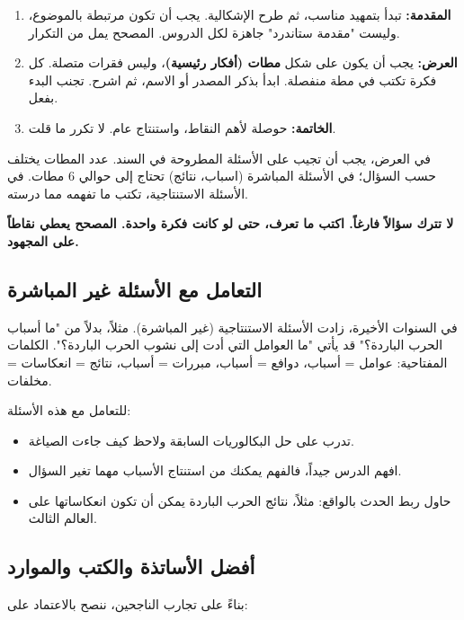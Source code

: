 \documentclass[12pt,a4paper]{book}
\newcommand{\importantAr}[1]{%
	\begin{important}
		\bfseries #1
	\end{important}
}
\begin{document}
	\begin{enumerate}
		\item \textbf{المقدمة:} تبدأ بتمهيد مناسب، ثم طرح الإشكالية. يجب أن تكون مرتبطة بالموضوع، وليست "مقدمة ستاندرد" جاهزة لكل الدروس. المصحح يمل من التكرار.
		\item \textbf{العرض:} يجب أن يكون على شكل \textbf{مطات (أفكار رئيسية)}، وليس فقرات متصلة. كل فكرة تكتب في مطة منفصلة. ابدأ بذكر المصدر أو الاسم، ثم اشرح. تجنب البدء بفعل.
		\item \textbf{الخاتمة:} حوصلة لأهم النقاط، واستنتاج عام. لا تكرر ما قلت.
	\end{enumerate}
	
	في العرض، يجب أن تجيب على الأسئلة المطروحة في السند. عدد المطات يختلف حسب السؤال؛ في الأسئلة المباشرة (اسباب، نتائج) تحتاج إلى حوالي 6 مطات. في الأسئلة الاستنتاجية، تكتب ما تفهمه مما درسته.
	
	\importantAr{لا تترك سؤالاً فارغاً. اكتب ما تعرف، حتى لو كانت فكرة واحدة. المصحح يعطي نقاطاً على المجهود.}
	
	\subsection{التعامل مع الأسئلة غير المباشرة}
	
	في السنوات الأخيرة، زادت الأسئلة الاستنتاجية (غير المباشرة). مثلاً، بدلاً من "ما أسباب الحرب الباردة؟" قد يأتي "ما العوامل التي أدت إلى نشوب الحرب الباردة؟". الكلمات المفتاحية: عوامل = أسباب، دوافع = أسباب، مبررات = أسباب، نتائج = انعكاسات = مخلفات.
	
	للتعامل مع هذه الأسئلة:
	
	\begin{itemize}
		\item تدرب على حل البكالوريات السابقة ولاحظ كيف جاءت الصياغة.
		\item افهم الدرس جيداً، فالفهم يمكنك من استنتاج الأسباب مهما تغير السؤال.
		\item حاول ربط الحدث بالواقع: مثلاً، نتائج الحرب الباردة يمكن أن تكون انعكاساتها على العالم الثالث.
	\end{itemize}
	
	\subsection{أفضل الأساتذة والكتب والموارد}
	
	بناءً على تجارب الناجحين، ننصح بالاعتماد على:
	
\end{document}
